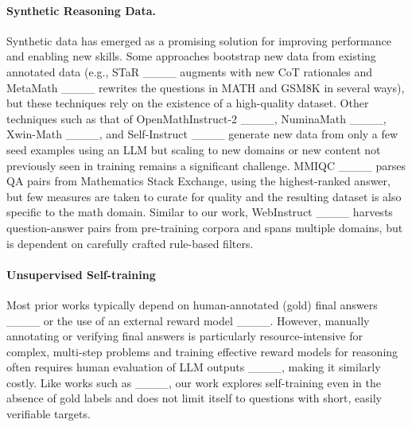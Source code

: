 \paragraph{Synthetic Reasoning Data.} Synthetic data has emerged as a promising solution for improving performance and enabling new skills. Some approaches bootstrap new data from existing annotated data (e.g., STaR ____ augments with new CoT rationales and MetaMath ____ rewrites the questions in MATH and GSM8K in several ways), but these techniques rely on the existence of a high-quality dataset. Other techniques such as that of OpenMathInstruct-2 ____, NuminaMath ____, Xwin-Math ____, and Self-Instruct ____ generate new data from only a few seed examples using an LLM but scaling to new domains or new content not previously seen in training remains a significant challenge. MMIQC ____ parses QA pairs from Mathematics Stack Exchange, using the highest-ranked answer, but few measures are taken to curate for quality and the resulting dataset is  also specific to the math domain. Similar to our work, WebInstruct ____ harvests question-answer pairs from pre-training corpora and spans multiple domains, but is dependent on carefully crafted rule-based filters. 



\paragraph{Unsupervised Self-training} Most prior works typically depend on human-annotated (gold) final answers ____ or the use of an external reward model ____. However, manually annotating or verifying final answers is particularly resource-intensive for complex, multi-step problems and training effective reward models for reasoning often requires human evaluation of LLM outputs ____, making it similarly costly. Like works such as ____, our work explores self-training even in the absence of gold labels and does not limit itself to questions with short, easily verifiable targets.



